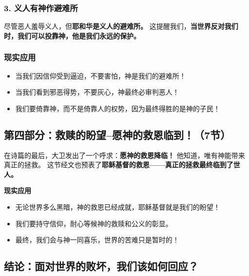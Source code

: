 \documentclass[a4paper, 12pt]{article}
\begin{document}
\subsubsection*{3. 义人有神作避难所  }
尽管恶人羞辱义人，但\textbf{耶和华是义人的避难所。} 这提醒我们，\textbf{当世界反对我们时，我们可以投靠神，他是我们永远的保护。 }


\subsubsection*{现实应用 }

\begin{itemize}
    \item 当我们因信仰受到逼迫，不要害怕，神是我们的避难所！  
    \item 当我们看到邪恶得势，不要灰心，神最终必审判恶人！
    \item 我们要倚靠神，而不是倚靠人的权势，因为最终得胜的是神的子民！
\end{itemize}


\subsection*{第四部分：救赎的盼望--愿神的救恩临到！（7节）}



在诗篇的最后，大卫发出了一个呼求：\textbf{愿神的救恩降临！} 他知道，唯有神能带来真正的拯救。 这节经文也预表了\textbf{耶稣基督的救恩——真正的拯救最终临到了世人。}  


\textbf{现实应用 }

\begin{itemize}
    \item 无论世界多么黑暗，神的救恩已经成就，耶稣基督就是我们的盼望！
    \item 我们要持守信仰，耐心等候神的救赎和公义的彰显。
    \item 最终，我们会与神一同喜乐，世界的苦难只是暂时的！
\end{itemize}



\subsection*{结论：面对世界的败坏，我们该如何回应？}
\end{document}
